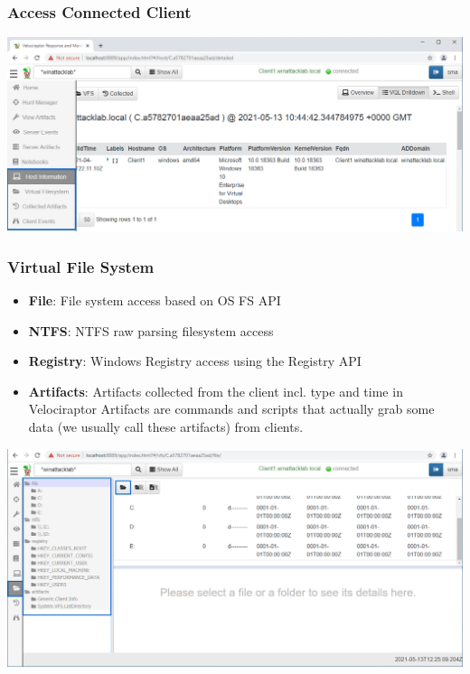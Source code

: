 \subsubsection*{Access Connected Client}
\includegraphics[width=\textwidth]{resources/06-velociraptor-interface-02.png}

\subsubsection*{Virtual File System}
\begin{itemize}
  \item \textbf{File}: File system access based on OS FS API
  \item \textbf{NTFS}: NTFS raw parsing filesystem access
  \item \textbf{Registry}: Windows Registry access using the Registry API
  \item \textbf{Artifacts}: Artifacts collected from the client incl. type and time in Velociraptor Artifacts are commands and scripts that actually grab some data (we usually call these artifacts) from clients.
\end{itemize}
\includegraphics[width=\textwidth]{resources/06-velociraptor-interface-03.png}

